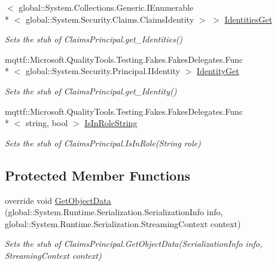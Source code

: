 \begin{DoxyCompactItemize}
$<$ global\-::\-System.\-Collections.\-Generic.\-I\-Enumerable\\*
$<$ global\-::\-System.\-Security.\-Claims.\-Claims\-Identity $>$ $>$ \hyperlink{class_system_1_1_security_1_1_claims_1_1_fakes_1_1_stub_claims_principal_a313766642e61968ad57957c2cd8202a0}{Identities\-Get}
\begin{DoxyCompactList}\small\item\em Sets the stub of Claims\-Principal.\-get\-\_\-\-Identities()\end{DoxyCompactList}\item 
mqttf\-::\-Microsoft.\-Quality\-Tools.\-Testing.\-Fakes.\-Fakes\-Delegates.\-Func\\*
$<$ global\-::\-System.\-Security.\-Principal.\-I\-Identity $>$ \hyperlink{class_system_1_1_security_1_1_claims_1_1_fakes_1_1_stub_claims_principal_a95f3e5178aa9437dc6a424e956883df0}{Identity\-Get}
\begin{DoxyCompactList}\small\item\em Sets the stub of Claims\-Principal.\-get\-\_\-\-Identity()\end{DoxyCompactList}\item 
mqttf\-::\-Microsoft.\-Quality\-Tools.\-Testing.\-Fakes.\-Fakes\-Delegates.\-Func\\*
$<$ string, bool $>$ \hyperlink{class_system_1_1_security_1_1_claims_1_1_fakes_1_1_stub_claims_principal_a82c306cc3d7e5ca25f76789cb90a0c75}{Is\-In\-Role\-String}
\begin{DoxyCompactList}\small\item\em Sets the stub of Claims\-Principal.\-Is\-In\-Role(\-String role)\end{DoxyCompactList}\end{DoxyCompactItemize}
\subsection*{Protected Member Functions}
\begin{DoxyCompactItemize}
\item 
override void \hyperlink{class_system_1_1_security_1_1_claims_1_1_fakes_1_1_stub_claims_principal_a5c052dfa90dea3aa988fca5c39e7d83a}{Get\-Object\-Data} (global\-::\-System.\-Runtime.\-Serialization.\-Serialization\-Info info, global\-::\-System.\-Runtime.\-Serialization.\-Streaming\-Context context)
\begin{DoxyCompactList}\small\item\em Sets the stub of Claims\-Principal.\-Get\-Object\-Data(\-Serialization\-Info info, Streaming\-Context context)\end{DoxyCompactList}\end{DoxyCompactItemize}
